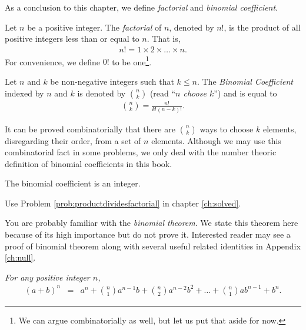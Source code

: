 \documentclass{subfile}
\begin{document}
As a conclusion to this chapter, we define \textit{factorial} and \textit{binomial coefficient}.

		\begin{definition}[Factorial]
			Let $n$ be a positive integer. The \textit{factorial} of $n$, denoted by $n!$, is the product of all positive integers less than or equal to $n$. That is,
				\begin{align*}
					n! = 1 \times 2 \times \dots \times n.
				\end{align*}
			For convenience, we define $0!$ to be one\footnote{We can argue combinatorially as well, but let us put that aside for now.}.
		\end{definition}

		\begin{definition}
			Let $n$ and $k$ be non-negative integers such that $k \leq n$. The \textit{Binomial Coefficient} indexed by $n$ and $k$ is denoted by $\displaystyle \binom{n}{k}$ (read ``\textit{$n$ choose $k$}'') and is equal to
				\begin{align*}
					\binom{n}{k} = \frac{n!}{k!(n-k)!}.
				\end{align*}
		\end{definition}

		\begin{note}
			It can be proved combinatorially that there are $\binom{n}{k}$ ways to choose $k$ elements, disregarding their order, from a set of $n$ elements. Although we may use this combinatorial fact in some problems, we only deal with the number theoric definition of binomial coefficients in this book.
		\end{note}

		\begin{proposition}
			The binomial coefficient is an integer.
		\end{proposition}

		\begin{hint}
			Use Problem \ref{prob:productdividesfactorial} in chapter \ref{ch:solved}.
		\end{hint}
	You are probably familiar with the \textit{binomial theorem}. We state this theorem here because of its high importance but do not prove it. Interested reader may see a proof of binomial theorem along with several useful related identities in Appendix \ref{ch:null}.
		\begin{theorem}\slshape
			For any positive integer $n$,
				\begin{eqnarray*}
					(a+b)^n & = & a^n+\binom{n}{1}a^{n-1}b+\binom{n}{2}a^{n-2}b^2+\dots+\binom{n}{1}ab^{n-1}+b^n.
				\end{eqnarray*}
		\end{theorem}
\end{document}
